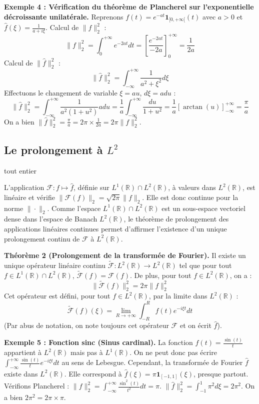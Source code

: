 \documentclass[11pt,a4paper]{article}
\begin{document}
\textbf{Exemple 4 : Vérification du théorème de Plancherel sur l'exponentielle décroissante unilatérale.}
Reprenons $f(t) = e^{-at} \mathbf{1}_{[0, +\infty[}(t)$ avec $a > 0$ et $\hat{f}(\xi) = \frac{1}{a+i\xi}$.
Calcul de $\|f\|_2^2$ :
$$ \|f\|_2^2 = \int_{0}^{+\infty} e^{-2at} dt = \left[ \frac{e^{-2at}}{-2a} \right]_0^{+\infty} = \frac{1}{2a} $$
Calcul de $\|\hat{f}\|_2^2$ :
$$ \|\hat{f}\|_2^2 = \int_{-\infty}^{+\infty} \frac{1}{a^2 + \xi^2} d\xi $$
Effectuons le changement de variable $\xi = a u$, $d\xi = a du$ :
$$ \|\hat{f}\|_2^2 = \int_{-\infty}^{+\infty} \frac{1}{a^2(1+u^2)} a du = \frac{1}{a} \int_{-\infty}^{+\infty} \frac{du}{1+u^2} = \frac{1}{a} \left[ \arctan(u) \right]_{-\infty}^{+\infty} = \frac{\pi}{a} $$
On a bien $\|\hat{f}\|_2^2 = \frac{\pi}{a} = 2\pi \times \frac{1}{2a} = 2\pi \|f\|_2^2$.

\subsection{Le prolongement à $L^2$} tout entier

L'application $\mathcal{F} : f \mapsto \hat{f}$, définie sur $L^1(\mathbb{R}) \cap L^2(\mathbb{R})$, à valeurs dans $L^2(\mathbb{R})$, est linéaire et vérifie $\|\mathcal{F}(f)\|_2 = \sqrt{2\pi}\|f\|_2$. Elle est donc continue pour la norme $\|\cdot\|_2$.
Comme l'espace $L^1(\mathbb{R}) \cap L^2(\mathbb{R})$ est un sous-espace vectoriel dense dans l'espace de Banach $L^2(\mathbb{R})$, le théorème de prolongement des applications linéaires continues permet d'affirmer l'existence d'un unique prolongement continu de $\mathcal{F}$ à $L^2(\mathbb{R})$.

\textbf{Théorème 2 (Prolongement de la transformée de Fourier).}
Il existe un unique opérateur linéaire continu $\widetilde{\mathcal{F}} : L^2(\mathbb{R}) \to L^2(\mathbb{R})$ tel que pour tout $f \in L^1(\mathbb{R}) \cap L^2(\mathbb{R})$, $\widetilde{\mathcal{F}}(f) = \mathcal{F}(f)$.
De plus, pour tout $f \in L^2(\mathbb{R})$, on a :
$$ \|\widetilde{\mathcal{F}}(f)\|_2^2 = 2\pi \|f\|_2^2 $$
Cet opérateur est défini, pour tout $f \in L^2(\mathbb{R})$, par la limite dans $L^2(\mathbb{R})$ :
$$ \widetilde{\mathcal{F}}(f)(\xi) = \lim_{R \to +\infty} \int_{-R}^{R} f(t) e^{-i\xi t} dt $$
(Par abus de notation, on note toujours cet opérateur $\mathcal{F}$ et on écrit $\hat{f}$).

\textbf{Exemple 5 : Fonction sinc (Sinus cardinal).}
La fonction $f(t) = \frac{\sin(t)}{t}$ appartient à $L^2(\mathbb{R})$ mais pas à $L^1(\mathbb{R})$. On ne peut donc pas écrire $\int_{-\infty}^{+\infty} \frac{\sin(t)}{t} e^{-i\xi t} dt$ au sens de Lebesgue.
Cependant, la transformée de Fourier $\hat{f}$ existe dans $L^2(\mathbb{R})$. Elle correspond à $\hat{f}(\xi) = \pi \mathbf{1}_{[-1, 1]}(\xi)$, presque partout.
Vérifions Plancherel :
$\|f\|_2^2 = \int_{-\infty}^{+\infty} \frac{\sin^2(t)}{t^2} dt = \pi$.
$\|\hat{f}\|_2^2 = \int_{-1}^1 \pi^2 d\xi = 2\pi^2$.
On a bien $2\pi^2 = 2\pi \times \pi$.
\end{document}
